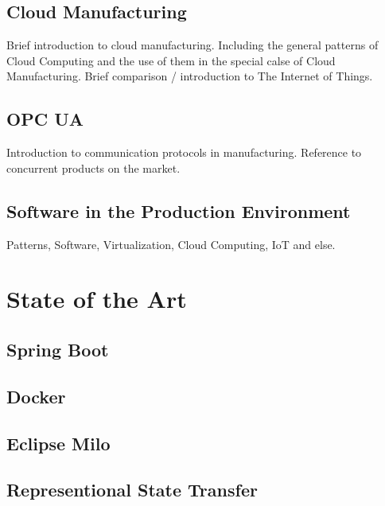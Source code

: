 \documentclass[
a4paper,
twoside,
bibliography=totoc,
headsepline,
cleardoublepage=empty,
parskip=half,
draft=false
]{scrbook}
\begin{document}
		\section{Cloud Manufacturing}\label{sec:cloud_manufacturing}
		
			Brief introduction to cloud manufacturing. Including the general patterns of Cloud Computing and the use of them in the special calse of Cloud Manufacturing. Brief comparison / introduction to The Internet of Things.
		
		\section{OPC UA} \label{sec:opc_ua}
		
			Introduction to communication protocols in manufacturing. Reference to concurrent products on the market.
			
		\section{Software in the Production Environment}\label{subsec:software_in_the_production_environment}
		
			Patterns, Software, Virtualization, Cloud Computing, IoT and else.
		
	\chapter{State of the Art}\label{ch:state_of_the_art}
			
		\section{Spring Boot}\label{subsec:spring_boot}
		
		\section{Docker}\label{sec:docker}
		
		\section{Eclipse Milo}\label{sec:eclipse_milo}
		
		\section{Representional State Transfer}\label{sec:rest}
						
\end{document}
